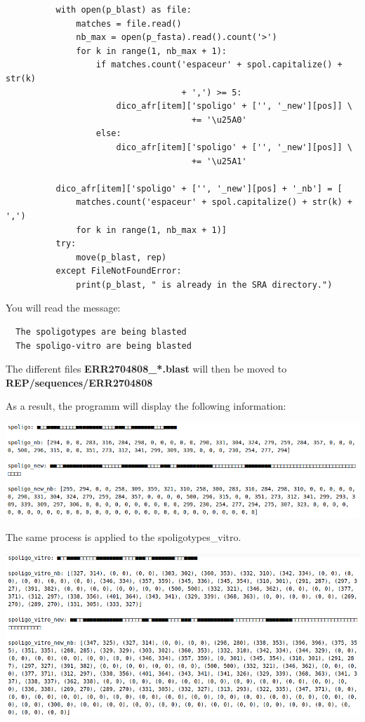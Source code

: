 \documentclass[twoside,a4paper,11pt,frenchb,openany]{report}
\begin{document}
\begin{verbatim}
          with open(p_blast) as file:
              matches = file.read()
              nb_max = open(p_fasta).read().count('>')
              for k in range(1, nb_max + 1):
                  if matches.count('espaceur' + spol.capitalize() + str(k)
                                   + ',') >= 5:
                      dico_afr[item]['spoligo' + ['', '_new'][pos]] \
                                     += '\u25A0'
                  else:
                      dico_afr[item]['spoligo' + ['', '_new'][pos]] \
                                     += '\u25A1'

          dico_afr[item]['spoligo' + ['', '_new'][pos] + '_nb'] = [
              matches.count('espaceur' + spol.capitalize() + str(k) + ',')
              for k in range(1, nb_max + 1)]
          try:
              move(p_blast, rep)
          except FileNotFoundError:
              print(p_blast, " is already in the SRA directory.")
\end{verbatim}

    You will read the message:

    \begin{verbatim}
  The spoligotypes are being blasted
  The spoligo-vitro are being blasted
\end{verbatim}

    The different files \textbf{ERR2704808\_*.blast} will then be moved to
\textbf{REP/sequences/ERR2704808}

    As a result, the programm will display the following information:

\includegraphics[width=16.5cm]{spoligo1.png}

    The same process is applied to the spoligotypes\_vitro.

\includegraphics[width=16.5cm]{spoligo2.png}
\end{document}
